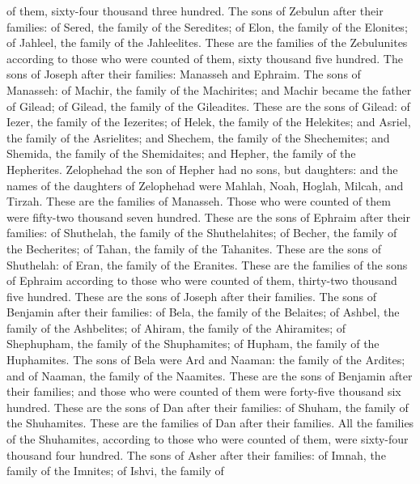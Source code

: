 of them, sixty-four thousand three hundred.  The sons of
Zebulun after their families: of Sered, the family of the Seredites; of
Elon, the family of the Elonites; of Jahleel, the family of the
Jahleelites.  These are the families of the Zebulunites
according to those who were counted of them, sixty thousand five
hundred.  The sons of Joseph after their families:
Manasseh and Ephraim.  The sons of Manasseh: of Machir,
the family of the Machirites; and Machir became the father of Gilead; of
Gilead, the family of the Gileadites.  These are the sons
of Gilead: of Iezer, the family of the Iezerites; of Helek, the family
of the Helekites;  and Asriel, the family of the
Asrielites; and Shechem, the family of the Shechemites; 
and Shemida, the family of the Shemidaites; and Hepher, the family of
the Hepherites.  Zelophehad the son of Hepher had no
sons, but daughters: and the names of the daughters of Zelophehad were
Mahlah, Noah, Hoglah, Milcah, and Tirzah.  These are the
families of Manasseh. Those who were counted of them were fifty-two
thousand seven hundred.  These are the sons of Ephraim
after their families: of Shuthelah, the family of the Shuthelahites; of
Becher, the family of the Becherites; of Tahan, the family of the
Tahanites.  These are the sons of Shuthelah: of Eran, the
family of the Eranites.  These are the families of the
sons of Ephraim according to those who were counted of them, thirty-two
thousand five hundred. These are the sons of Joseph after their
families.  The sons of Benjamin after their families: of
Bela, the family of the Belaites; of Ashbel, the family of the
Ashbelites; of Ahiram, the family of the Ahiramites;  of
Shephupham, the family of the Shuphamites; of Hupham, the family of the
Huphamites.  The sons of Bela were Ard and Naaman: the
family of the Ardites; and of Naaman, the family of the Naamites.
 These are the sons of Benjamin after their families; and
those who were counted of them were forty-five thousand six hundred.
 These are the sons of Dan after their families: of
Shuham, the family of the Shuhamites. These are the families of Dan
after their families.  All the families of the
Shuhamites, according to those who were counted of them, were sixty-four
thousand four hundred.  The sons of Asher after their
families: of Imnah, the family of the Imnites; of Ishvi, the family of
